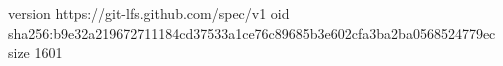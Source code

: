 version https://git-lfs.github.com/spec/v1
oid sha256:b9e32a219672711184cd37533a1ce76c89685b3e602cfa3ba2ba0568524779ec
size 1601
